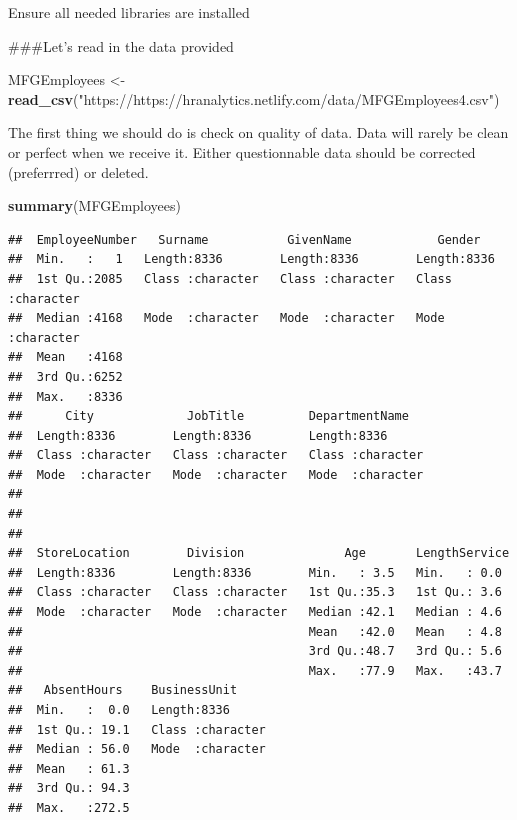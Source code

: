 \documentclass[12pt, krantz2,]{krantz}
\makeatletter
\newenvironment{Shaded}{\begin{snugshade}}{\end{snugshade}}
\newcommand{\KeywordTok}[1]{\textcolor[rgb]{0.27,0.27,0.27}{\textbf{#1}}}
\newcommand{\NormalTok}[1]{#1}
\newcommand{\StringTok}[1]{\textcolor[rgb]{0.5,0.5,0.5}{#1}}
\newenvironment{kframe}{%
\medskip{}
\setlength{\fboxsep}{.8em}
 \def\at@end@of@kframe{}%
 \ifinner\ifhmode%
  \def\at@end@of@kframe{\end{minipage}}%
  \begin{minipage}{\columnwidth}%
 \fi\fi%
 \def\FrameCommand##1{\hskip\@totalleftmargin \hskip-\fboxsep
 \colorbox{shadecolor}{##1}\hskip-\fboxsep
     \hskip-\linewidth \hskip-\@totalleftmargin \hskip\columnwidth}%
 \MakeFramed {\advance\hsize-\width
   \@totalleftmargin\z@ \linewidth\hsize
   \@setminipage}}%
 {\par\unskip\endMakeFramed%
 \at@end@of@kframe}
\renewenvironment{Shaded}{\begin{kframe}}{\end{kframe}}
\makeatother
\begin{document}
Ensure all needed libraries are installed

\#\#\#Let's read in the data provided

\begin{Shaded}
\begin{Highlighting}[]
\NormalTok{MFGEmployees <-}\StringTok{ }\KeywordTok{read_csv}\NormalTok{(}\StringTok{"https://https://hranalytics.netlify.com/data/MFGEmployees4.csv"}\NormalTok{)}
\end{Highlighting}
\end{Shaded}

The first thing we should do is check on quality of data. Data will rarely be clean or perfect when we receive it. Either questionnable data should be corrected (preferrred) or deleted.

\begin{Shaded}
\begin{Highlighting}[]
\KeywordTok{summary}\NormalTok{(MFGEmployees)}
\end{Highlighting}
\end{Shaded}

\begin{verbatim}
##  EmployeeNumber   Surname           GivenName            Gender         
##  Min.   :   1   Length:8336        Length:8336        Length:8336       
##  1st Qu.:2085   Class :character   Class :character   Class :character  
##  Median :4168   Mode  :character   Mode  :character   Mode  :character  
##  Mean   :4168                                                           
##  3rd Qu.:6252                                                           
##  Max.   :8336                                                           
##      City             JobTitle         DepartmentName    
##  Length:8336        Length:8336        Length:8336       
##  Class :character   Class :character   Class :character  
##  Mode  :character   Mode  :character   Mode  :character  
##                                                          
##                                                          
##                                                          
##  StoreLocation        Division              Age       LengthService 
##  Length:8336        Length:8336        Min.   : 3.5   Min.   : 0.0  
##  Class :character   Class :character   1st Qu.:35.3   1st Qu.: 3.6  
##  Mode  :character   Mode  :character   Median :42.1   Median : 4.6  
##                                        Mean   :42.0   Mean   : 4.8  
##                                        3rd Qu.:48.7   3rd Qu.: 5.6  
##                                        Max.   :77.9   Max.   :43.7  
##   AbsentHours    BusinessUnit      
##  Min.   :  0.0   Length:8336       
##  1st Qu.: 19.1   Class :character  
##  Median : 56.0   Mode  :character  
##  Mean   : 61.3                     
##  3rd Qu.: 94.3                     
##  Max.   :272.5
\end{verbatim}
\end{document}
